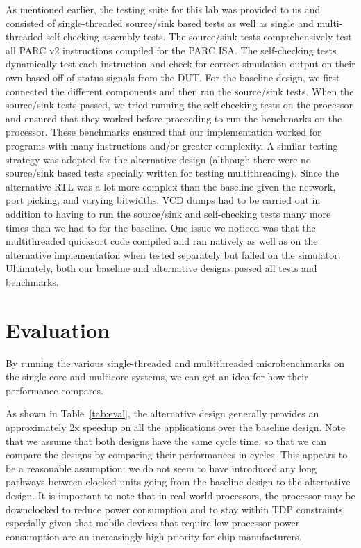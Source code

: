 \documentclass[10pt]{article}
\begin{document}
As mentioned earlier, the testing suite for this lab was provided to us and consisted of single-threaded source/sink based tests as well as single and multi-threaded self-checking assembly tests. The source/sink tests comprehensively test all PARC v2 instructions compiled for the PARC ISA. The self-checking tests dynamically test each instruction and check for correct simulation output on their own based off of status signals from the DUT. For the baseline design, we first connected the different components and then ran the source/sink tests. When the source/sink tests passed, we tried running the self-checking tests on the processor and ensured that they worked before proceeding to run the benchmarks on the processor. These benchmarks ensured that our implementation worked for programs with many instructions and/or greater complexity. A similar testing strategy was adopted for the alternative design (although there were no source/sink based tests specially written for testing multithreading). Since the alternative RTL was a lot more complex than the baseline given the network, port picking, and varying bitwidths, VCD dumps had to be carried out in addition to having to run the source/sink and self-checking tests many more times than we had to for the baseline. One issue we noticed was that the multithreaded quicksort code compiled and ran natively as well as on the alternative implementation when tested separately but failed on the simulator. Ultimately, both our baseline and alternative designs passed all tests and benchmarks. 



\section{Evaluation}

By running the various single-threaded and multithreaded microbenchmarks on the single-core and multicore systems, we can get an idea for how their performance compares. \par

As shown in Table~\ref{tab:eval}, the alternative design generally provides an approximately 2x speedup on all the applications over the baseline design. Note that we assume that both designs have the same cycle time, so that we can compare the designs by comparing their performances in cycles. This appears to be a reasonable assumption: we do not seem to have introduced any long pathways between clocked units going from the baseline design to the alternative design. It is important to note that in real-world processors, the processor may be downclocked to reduce power consumption and to stay within TDP constraints, especially given that mobile devices that require low processor power consumption are an increasingly high priority for chip manufacturers. \par
\end{document}
